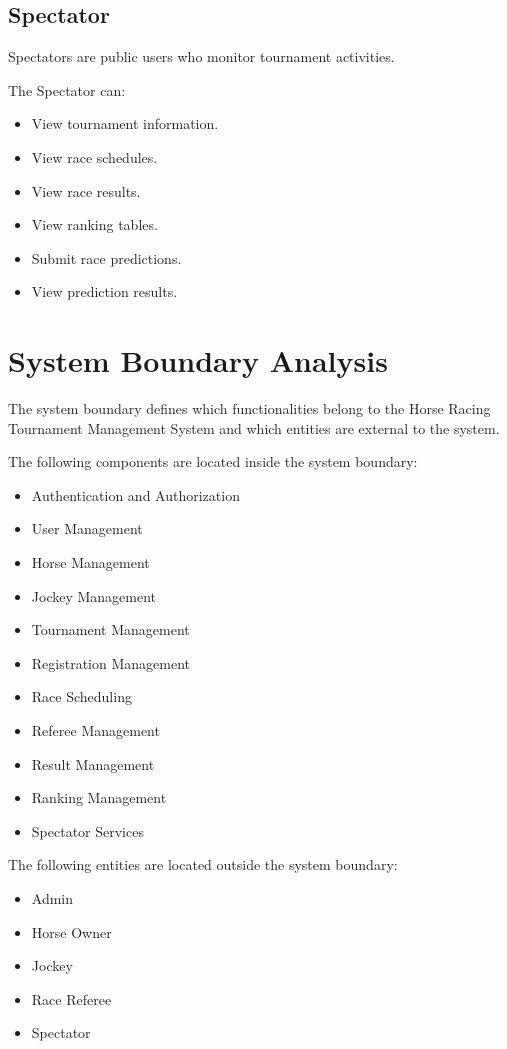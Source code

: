 \subsection{Spectator}

Spectators are public users who monitor tournament activities.

The Spectator can:

\begin{itemize}
	\item View tournament information.
	\item View race schedules.
	\item View race results.
	\item View ranking tables.
	\item Submit race predictions.
	\item View prediction results.
\end{itemize}

\section{System Boundary Analysis}

The system boundary defines which functionalities belong to the Horse Racing Tournament Management System and which entities are external to the system.

The following components are located inside the system boundary:

\begin{itemize}
	\item Authentication and Authorization
	\item User Management
	\item Horse Management
	\item Jockey Management
	\item Tournament Management
	\item Registration Management
	\item Race Scheduling
	\item Referee Management
	\item Result Management
	\item Ranking Management
	\item Spectator Services
\end{itemize}

The following entities are located outside the system boundary:

\begin{itemize}
	\item Admin
	\item Horse Owner
	\item Jockey
	\item Race Referee
	\item Spectator
\end{itemize}

